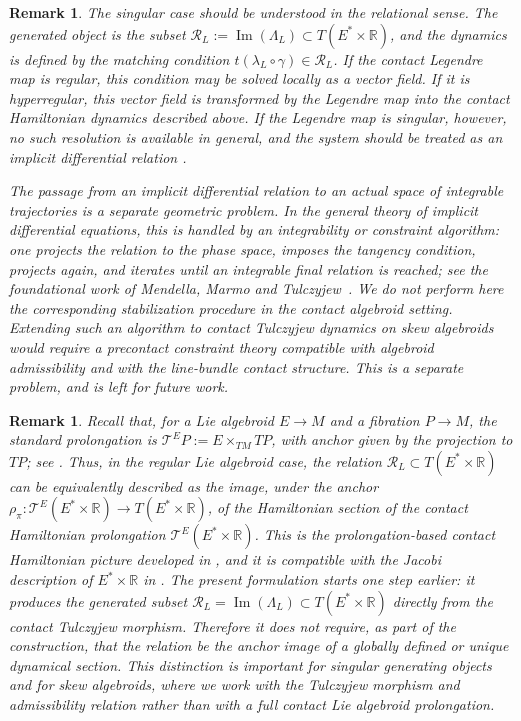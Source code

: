 \documentclass[10pt,a4paper]{amsart}
\newtheorem{remark}[theorem]{Remark}
\begin{document}
\begin{remark}
 The singular case should be understood in the relational sense. The generated
object is the subset $\mathcal R_L:=\operatorname{Im}(\Lambda_L)\subset T(E^*\times \mathbb R)$, and the dynamics is defined by the matching condition $t(\lambda_L\circ\gamma)\in \mathcal R_L$. If the contact Legendre map is regular, this condition may be solved locally as
a vector field. If it is hyperregular, this vector field is transformed by the
Legendre map into the contact Hamiltonian dynamics described above. If the
Legendre map is singular, however, no such resolution is available in general,
and the system should be treated as an implicit differential relation \cite{deLeonLainz2019}.

The passage from an implicit differential relation to an actual space of integrable trajectories is a separate geometric problem. In the general theory of implicit differential equations, this is handled by an integrability or constraint algorithm: one projects the relation to the phase space, imposes the tangency condition, projects again, and iterates until an integrable final relation is reached; see the foundational work of Mendella, Marmo and Tulczyjew~\cite{MendellaMarmoTulczyjew1995}. We do not perform here the corresponding stabilization procedure in the contact algebroid setting. Extending such an algorithm to contact Tulczyjew dynamics on skew algebroids would require a precontact constraint theory compatible with algebroid admissibility and with the line-bundle contact structure. This is a separate problem, and is left for future work.
\end{remark}

\begin{remark}
Recall that, for a Lie algebroid \(E\to M\) and a fibration \(P\to M\), the
standard prolongation is
$\mathcal T^E P:=E\times_{TM}TP$,
with anchor given by the projection to \(TP\); see
\cite{Martinez2001}. Thus, in the regular Lie algebroid case, the relation
$\mathcal R_L\subset T(E^*\times\mathbb R)$
can be equivalently described as the image, under the anchor $\rho_\pi:\mathcal T^E(E^*\times\mathbb R)\rightarrow T(E^*\times\mathbb R)$, of the Hamiltonian section of the contact Hamiltonian prolongation
\(\mathcal T^E(E^*\times\mathbb R)\). This is the prolongation-based contact
Hamiltonian picture developed in
\cite{SimoesColomboDeLeonSalgadoSouto2025Annali}, and it is compatible with the
Jacobi description of \(E^*\times\mathbb R\) in
\cite{ASCLMS2024}. The present formulation starts one step earlier: it produces the generated
subset $\mathcal R_L=\operatorname{Im}(\Lambda_L)\subset T(E^*\times\mathbb R)$
directly from the contact Tulczyjew morphism. Therefore it does not require, as
part of the construction, that the relation be the anchor image of a globally
defined or unique dynamical section. This distinction is important for singular
generating objects and for skew algebroids, where we work with the Tulczyjew
morphism and admissibility relation rather than with a full contact Lie
algebroid prolongation.
\end{remark}
\end{document}
